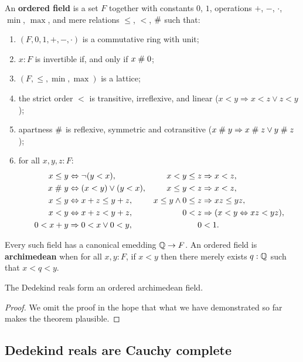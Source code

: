 \begin{defn} \label{ordered-field} An \textbf{ordered field} is a set $F$ together with
  constants $0$, $1$, operations $+$, $-$, $\cdot$, $\min$, $\max$, and mere relations
  $\leq$, $<$, $\mathrel{\#}$ such that:
  \begin{enumerate}
  \item $(F, 0, 1, {+}, {-}, {\cdot})$ is a commutative ring with unit;
  \item $x : F$ is invertible if, and only if $x \mathrel{\#} 0$;
  \item $(F, {\leq}, {\min}, {\max})$ is a lattice;
  \item the strict order $<$ is transitive, irreflexive, and linear ($x < y \Rightarrow x < z \lor z < y$);
  \item apartness $\mathrel{\#}$ is reflexive, symmetric and cotransitive ($x \mathrel{\#} y \Rightarrow x \mathrel{\#} z \lor y \mathrel{\#} z$);
  \item for all $x, y, z : F$:
    \begin{align*}
      x \leq y &\Leftrightarrow \lnot (y < x), &
      x < y \leq z &\Rightarrow x < z, \\
      x \mathrel{\#} y &\Leftrightarrow (x < y) \lor (y < x), &
      x \leq y < z &\Rightarrow x < z, \\
      x \leq y &\Leftrightarrow x + z \leq y + z, &
      x \leq y \land 0 \leq z &\Rightarrow x z \leq y z, \\
      x < y &\Leftrightarrow x + z < y + z, &
      0 < z &\Rightarrow (x < y \Leftrightarrow x z < y z), \\
      0 < x + y &\Rightarrow 0 < x \lor 0 < y, &
      0 &< 1.
    \end{align*}
  \end{enumerate}
  Every such field has a canonical emedding $\mathbb{Q} \to F$. An ordered field is
  \textbf{archimedean} when for all $x, y : F$, if $x < y$ then there merely exists $q :
  \mathbb{Q}$ such that $x < q < y$.
\end{defn}

\begin{thm} \label{RD-archimedean-ordered-field}
  The Dedekind reals form an ordered archimedean field.
\end{thm}

\begin{proof}
  We omit the proof in the hope that what we have demonstrated so far makes the theorem
  plausible.
\end{proof}

\subsection{Dedekind reals are Cauchy complete}
\label{sec:RD-cauchy-complete}

